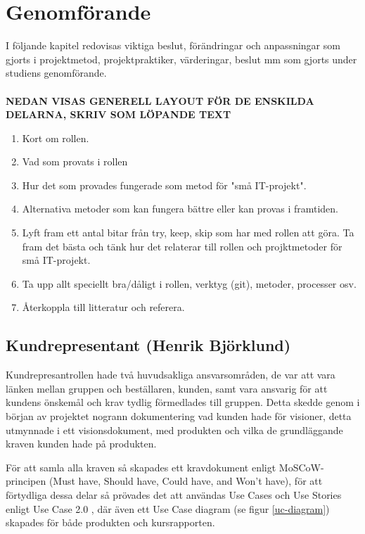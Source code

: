 \documentclass[conference,a4paper]{IEEEtran}
\begin{document}
\section{Genomförande} \label{sec:genom}
I följande kapitel redovisas viktiga beslut, förändringar och anpassningar som gjorts i projektmetod, projektpraktiker, värderingar, beslut mm som gjorts under studiens genomförande.\\
\\
\textbf{NEDAN VISAS GENERELL LAYOUT FÖR DE ENSKILDA DELARNA, SKRIV SOM LÖPANDE TEXT}
\begin{enumerate}
\item Kort om rollen.
\item Vad som provats i rollen
\item Hur det som provades fungerade som metod för "små IT-projekt".
\item Alternativa metoder som kan fungera bättre eller kan provas i framtiden.
\item Lyft fram ett antal bitar från try, keep, skip som har med rollen att göra. Ta fram det bästa och tänk hur det relaterar till rollen och projktmetoder för små IT-projekt.
\item Ta upp allt speciellt bra/dåligt i rollen, verktyg (git), metoder, processer osv.
\item Återkoppla till litteratur och referera.
\end{enumerate}

\subsection{Kundrepresentant (Henrik Björklund)}
Kundrepresantrollen hade två huvudsakliga ansvarsområden, de var att vara länken mellan gruppen och beställaren, kunden, samt vara ansvarig för att kundens önskemål och krav tydlig förmedlades till gruppen. Detta skedde genom i början av projektet nogrann dokumentering vad kunden hade för visioner, detta utmynnade i ett visionsdokument, med produkten och vilka de grundläggande kraven kunden hade på produkten.

För att samla alla kraven så skapades ett kravdokument enligt MoSCoW-principen (Must have, Should have, Could have, and Won't have), för att förtydliga dessa delar så prövades det att användas Use Cases och Use Stories enligt Use Case 2.0 \cite{Jacobson11}, där även ett Use Case diagram (se figur \ref{uc-diagram}) skapades för både produkten och kursrapporten.
\end{document}
